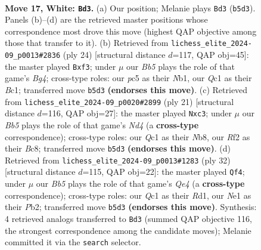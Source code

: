 \documentclass[11pt]{article}
\begin{document}
\clearpage

\begin{figure}[p]\centering
\begin{subfigure}{0.46\textwidth}\centering
\resizebox{\linewidth}{!}{%
\newchessgame
\chessboard[
  setfen={r5k1/p2brppp/4pn2/1Bpq4/n7/4P1P1/PP3RPP/RNQ1N1K1 w - - 2 17},
  showmover=false,
  pgfstyle=straightmove, color=movearrow, markmove={b5-d3}
]}
\caption{}
\end{subfigure}\hfill
\begin{subfigure}{0.46\textwidth}\centering
\resizebox{\linewidth}{!}{%
\newchessgame
\chessboard[
  setfen={r1b2rk1/ppp1n1pp/2n3q1/8/3PR1B1/2P2p2/PP3PPP/RNBQ2K1 w - - 1 13},
  showmover=false,
  pgfstyle=straightmove, color=movearrow, markmove={g4-f3}
]}
\caption{}
\end{subfigure}
\\[4pt]
\begin{subfigure}{0.46\textwidth}\centering
\resizebox{\linewidth}{!}{%
\newchessgame
\chessboard[
  setfen={rnbq1r2/pp2ppk1/6p1/2pn4/3P3R/2N2N2/PP2PPP1/R2QKB2 b Q - 2 11},
  showmover=false,
  pgfstyle=straightmove, color=movearrow, markmove={d5-c3}
]}
\caption{}
\end{subfigure}\hfill
\begin{subfigure}{0.46\textwidth}\centering
\resizebox{\linewidth}{!}{%
\newchessgame
\chessboard[
  setfen={r1br2k1/ppp2ppp/2n3q1/8/3pQ2P/3B1N2/PPP2PP1/1K1R3R w - - 5 17},
  showmover=false,
  pgfstyle=straightmove, color=movearrow, markmove={e4-f4}
]}
\caption{}
\end{subfigure}
\caption{\textbf{Move 17, White: \texttt{Bd3}.} (a) Our position; Melanie plays \texttt{Bd3} (\texttt{b5d3}). Panels (b)--(d) are the retrieved master positions whose correspondence most drove this move (highest QAP objective among those that transfer to it). (b) Retrieved from \texttt{lichess\_elite\_2024-09\_p0013\#2836} (ply 24) [structural distance $d$=117, QAP obj=45]: the master played \texttt{Bxf3}; under $\mu$ our \emph{Bb5} plays the role of that game's \emph{Bg4}; cross-type roles: our \emph{p}c5 as their \emph{N}b1, our \emph{Q}c1 as their \emph{B}c1; transferred move \texttt{b5d3} \textbf{(endorses this move)}. (c) Retrieved from \texttt{lichess\_elite\_2024-09\_p0020\#2899} (ply 21) [structural distance $d$=116, QAP obj=27]: the master played \texttt{Nxc3}; under $\mu$ our \emph{Bb5} plays the role of that game's \emph{Nd4} (a \textbf{cross-type} correspondence); cross-type roles: our \emph{Q}c1 as their \emph{N}b8, our \emph{R}f2 as their \emph{B}c8; transferred move \texttt{b5d3} \textbf{(endorses this move)}. (d) Retrieved from \texttt{lichess\_elite\_2024-09\_p0013\#1283} (ply 32) [structural distance $d$=115, QAP obj=22]: the master played \texttt{Qf4}; under $\mu$ our \emph{Bb5} plays the role of that game's \emph{Qe4} (a \textbf{cross-type} correspondence); cross-type roles: our \emph{Q}c1 as their \emph{R}d1, our \emph{N}e1 as their \emph{P}b2; transferred move \texttt{b5d3} \textbf{(endorses this move)}. Synthesis: 4 retrieved analogs transferred to \texttt{Bd3} (summed QAP objective 116, the strongest correspondence among the candidate moves); Melanie committed it via the \texttt{search} selector.}
\label{fig:thought-m32}
\end{figure}
\end{document}

